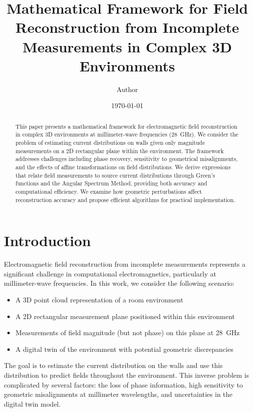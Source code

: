\documentclass[12pt,a4paper]{article}
\title{Mathematical Framework for Field Reconstruction from Incomplete Measurements in Complex 3D Environments}
\author{Author}
\date{\today}
\begin{document}
\maketitle

\begin{abstract}
    This paper presents a mathematical framework for electromagnetic field reconstruction in complex 3D environments at millimeter-wave frequencies (\SI{28}{\giga\hertz}). We consider the problem of estimating current distributions on walls given only magnitude measurements on a 2D rectangular plane within the environment. The framework addresses challenges including phase recovery, sensitivity to geometrical misalignments, and the effects of affine transformations on field distributions. We derive expressions that relate field measurements to source current distributions through Green's functions and the Angular Spectrum Method, providing both accuracy and computational efficiency. We examine how geometric perturbations affect reconstruction accuracy and propose efficient algorithms for practical implementation.
\end{abstract}

\section{Introduction}

Electromagnetic field reconstruction from incomplete measurements represents a significant challenge in computational electromagnetics, particularly at millimeter-wave frequencies. In this work, we consider the following scenario:

\begin{itemize}
    \item A 3D point cloud representation of a room environment
    \item A 2D rectangular measurement plane positioned within this environment
    \item Measurements of field magnitude (but not phase) on this plane at \SI{28}{\giga\hertz}
    \item A digital twin of the environment with potential geometric discrepancies
\end{itemize}

The goal is to estimate the current distribution on the walls and use this distribution to predict fields throughout the environment. This inverse problem is complicated by several factors: the loss of phase information, high sensitivity to geometric misalignments at millimeter wavelengths, and uncertainties in the digital twin model.
\end{document}
